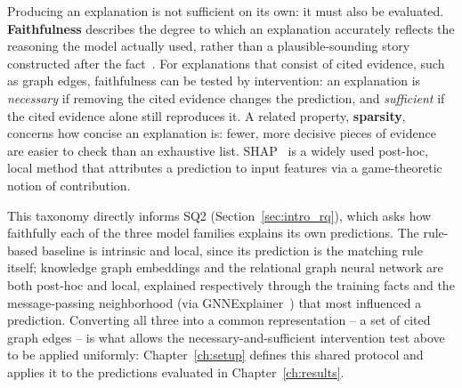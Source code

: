 Producing an explanation is not sufficient on its own: it must also be
evaluated. \textbf{Faithfulness} describes the degree to which an
explanation accurately reflects the reasoning the model actually used,
rather than a plausible-sounding story constructed after the
fact~\cite{jacovi2020faithfulness}. For explanations that consist of
cited evidence, such as graph edges, faithfulness can be tested by
intervention: an explanation is \emph{necessary} if removing the cited
evidence changes the prediction, and \emph{sufficient} if the cited
evidence alone still reproduces it. A related property,
\textbf{sparsity}, concerns how concise an explanation is: fewer, more
decisive pieces of evidence are easier to check than an exhaustive list.
SHAP~\cite{lundberg2017shap} is a widely used post-hoc, local method that
attributes a prediction to input features via a game-theoretic notion of
contribution.

This taxonomy directly informs SQ2 (Section~\ref{sec:intro_rq}), which
asks how faithfully each of the three model families explains its own
predictions. The rule-based baseline is intrinsic and local, since its
prediction is the matching rule itself; knowledge graph embeddings and
the relational graph neural network are both post-hoc and local,
explained respectively through the training facts and the
message-passing neighborhood (via
GNNExplainer~\cite{ying2019gnnexplainer}) that most influenced a
prediction. Converting all three into a common representation -- a set
of cited graph edges -- is what allows the necessary-and-sufficient
intervention test above to be applied uniformly: Chapter~\ref{ch:setup}
defines this shared protocol and applies it to the predictions evaluated
in Chapter~\ref{ch:results}.
